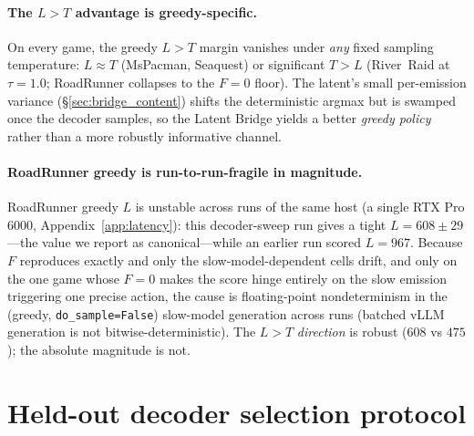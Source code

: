 \documentclass[11pt]{article}
\begin{document}
\smallskip\noindent

\smallskip

\paragraph{The $L\!>\!T$ advantage is greedy-specific.} On every game, the greedy $L\!>\!T$ margin
vanishes under \emph{any} fixed sampling temperature: $L\!\approx\!T$ (MsPacman, Seaquest) or
significant $T\!>\!L$ (River~Raid at $\tau\!=\!1.0$; RoadRunner collapses to the $F\!=\!0$ floor).
The latent's small per-emission variance (\S\ref{sec:bridge_content}) shifts the deterministic
argmax but is swamped once the decoder samples, so the Latent Bridge yields a better \emph{greedy policy}
rather than a more robustly informative channel.

\paragraph{RoadRunner greedy is run-to-run-fragile in magnitude.} RoadRunner greedy $L$ is unstable
across runs of the same host (a single RTX Pro 6000, Appendix~\ref{app:latency}): this decoder-sweep
run gives a tight $L\!=\!608\pm29$---the value we report as canonical---while an earlier run scored
$L\!=\!967$. Because $F$ reproduces exactly and only the slow-model-dependent cells drift, and only on
the one game whose $F\!=\!0$ makes the score hinge entirely on the slow emission triggering one precise
action, the cause is floating-point nondeterminism in the (greedy, \texttt{do\_sample=False})
slow-model generation across runs (batched vLLM generation is not bitwise-deterministic). The
$L\!>\!T$ \emph{direction} is robust ($608$ vs $475$); the absolute magnitude is not.

\section{Held-out decoder selection protocol}
\label{app:heldout}
\end{document}
